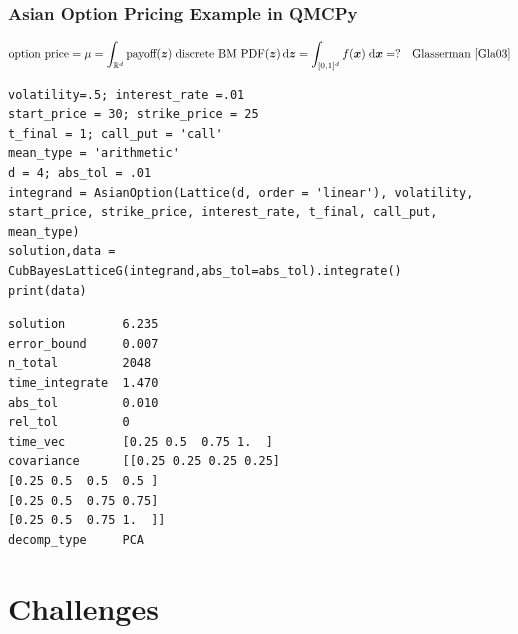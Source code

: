 \documentclass[11pt,compress,xcolor={usenames,dvipsnames},aspectratio=169]{beamer}
\begin{document}
\begin{frame}[fragile]\frametitle{Asian Option Pricing Example in QMCPy \href{https://colab.research.google.com/drive/1KrlrtLu7j8Ff7YsSJjPMiGUr-UKfqwxm?usp=sharing}{}}
	\vspace{-5ex}
	\[
	\text{option price} = \mu = \int_{\mathbb{R}^d} \text{payoff}(\boldsymbol{z}) \; \text{discrete BM PDF}(\boldsymbol{z})   \, {\rm d} \boldsymbol{z} = \int_{[0,1]^d} f(\boldsymbol{x}) \; {\rm d} \boldsymbol{x}  = ? \quad \text{Glasserman  \cite{Gla03}}
	\]
\noindent\begin{minipage}{0.52\textwidth}
\begin{lstlisting}[style=Python]
volatility=.5; interest_rate =.01
start_price = 30; strike_price = 25
t_final = 1; call_put = 'call'
mean_type = 'arithmetic'
d = 4; abs_tol = .01
integrand = AsianOption(Lattice(d, order = 'linear'), volatility, start_price, strike_price, interest_rate, t_final, call_put, mean_type)
solution,data = CubBayesLatticeG(integrand,abs_tol=abs_tol).integrate()
print(data)
\end{lstlisting}
\end{minipage} 
\qquad
\begin{minipage}{0.42\textwidth}
\begin{lstlisting}[style=Python]
solution        6.235
error_bound     0.007
n_total         2048
time_integrate  1.470
abs_tol         0.010
rel_tol         0
time_vec        [0.25 0.5  0.75 1.  ]
covariance      [[0.25 0.25 0.25 0.25]
[0.25 0.5  0.5  0.5 ]
[0.25 0.5  0.75 0.75]
[0.25 0.5  0.75 1.  ]]
decomp_type     PCA
\end{lstlisting}
\end{minipage} 
	
\end{frame}


\section{Challenges}
\end{document}
